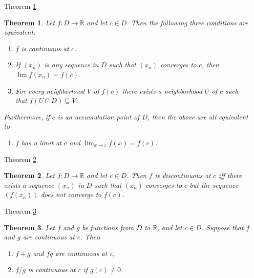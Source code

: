 \documentclass[avery5371,grid]{flashcards}
\newtheorem{theorem}{Theorem}
\newcommand{\bb}[1]{\mathbb{#1}}
\newcommand{\R}{\bb{R}}
\begin{document}
\begin{flashcard}[Theorem]{Theorem \ref{thm69}}
\begin{small}
\begin{theorem}
\label{thm69}
Let $f : D \to \R$ and let $c \in D$.  Then the following three
conditions are equivalent:
\begin{enumerate}
\item[(a)]  $f$ is continuous at $c$.
\item[(b)]  If $(x_n)$ is any sequence in $D$ such that $(x_n)$
converges to $c$, then $\lim f(x_n) = f(c)$.
\item[(c)]  For every neighborhood $V$ of $f(c)$ there exists a
neighborhood $U$ of $c$ such that $f(U \cap D) \subseteq V$.
\end{enumerate}
Furthermore, if $c$ is an accumulation point of $D$, then the above are
all equivalent to
\begin{enumerate}
 \item[(d)]  $f$ has a limit at $c$ and $\lim _{x \to c} f(x) = f(c)$.
\end{enumerate}
\end{theorem}
\end{small}
\end{flashcard}

\begin{flashcard}[Theorem]{Theorem \ref{thm70}}
\begin{theorem}
\label{thm70}
Let $f:D \to \R$ and let $c \in D$.  Then $f$ is discontinuous at $c$
iff there exists a sequence $(x_n)$ in $D$ such that $(x_n)$ converges
to $c$ but the sequence $(f(x_n))$ does not converge to $f(c)$.
\end{theorem}
\end{flashcard}

\begin{flashcard}[Theorem]{Theorem \ref{thm71}}
\begin{theorem}
\label{thm71}
Let $f$ and $g$ be functions from $D$ to $\R$, and let $c \in D$.
Suppose that $f$ and $g$ are continuous at $c$.  Then
\begin{enumerate}
\item[(a)]  $f+g$ and $fg$ are continuous at $c$,
\item[(b)]  $f/g$ is continuous at $c$ if $g(c) \not= 0$.
\end{enumerate}
\end{theorem}
\end{flashcard}
\end{document}
